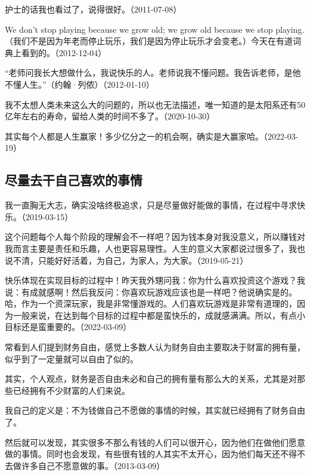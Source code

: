 护士的话我也看过了，说得很好。（2011-07-08）

We don't stop playing because we grow old; we grow old because we stop playing.（我们不是因为年老而停止玩乐，我们是因为停止玩乐才会变老。）今天在有道词典上看到的。（2012-12-04）

“老师问我长大想做什么，我说快乐的人。老师说我不懂问题。我告诉老师，是他不懂人生。”（约翰·列侬）（2012-01-10）


我不太想人类未来这么大的问题的，所以也无法描述，唯一知道的是太阳系还有50亿年左右的寿命，留给人类的时间不多了。（2020-10-30）

其实每个人都是人生赢家！多少亿分之一的机会啊，确实是大赢家哈。（2022-03-19）

\subsection{尽量去干自己喜欢的事情}


我一直胸无大志，确实没啥终极追求，只是尽量做好能做的事情，在过程中寻求快乐。（2019-03-15）


这个问题每个人每个阶段的理解会不一样吧？因为钱本身对我没意义，所以赚钱对我而言主要是责任和乐趣，人也更容易理性。人生的意义大家都说过很多了，我也说不清，只能好好活着，为自己，为家人，为大家。（2019-05-21）


快乐体现在实现目标的过程中！昨天我外甥问我：你为什么喜欢投资这个游戏？我说：有成就感啊！然后我反问：你喜欢玩游戏应该也是一样吧？他说确实是的。哈，作为一个资深玩家，我是非常懂游戏的。人们喜欢玩游戏是非常有道理的，因为一般来说，在达到每个目标的过程中都是蛮快乐的，成就感满满。所以，有点小目标还是蛮重要的。（2022-03-09）

常看到人们提到财务自由，感觉上多数人认为财务自由主要取决于财富的拥有量，似乎到了一定量就可以自由了似的。

其实，个人观点，财务是否自由未必和自己的拥有量有那么大的关系，尤其是对那些已经拥有不少财富的人们来说。

我自己的定义是：不为钱做自己不愿做的事情的时候，其实就已经拥有了财务自由了。

然后就可以发现，其实很多不那么有钱的人们可以很开心，因为他们在做他们愿意做的事情。同时也会发现，有些很有钱的人其实不太开心，因为他们每天还不得不去做许多自己不愿意做的事。（2013-03-09）

